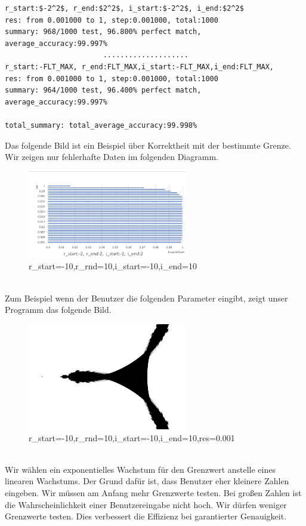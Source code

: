 \documentclass[course=erap]{aspdoc}
\begin{document}
 \begin{lstlisting}[mathescape=true]
r_start:$-2^2$, r_end:$2^2$, i_start:$-2^2$, i_end:$2^2$
res: from 0.001000 to 1, step:0.001000, total:1000
summary: 968/1000 test, 96.800% perfect match, average_accuracy:99.997%
                       ....................
r_start:-FLT_MAX, r_end:FLT_MAX,i_start:-FLT_MAX,i_end:FLT_MAX,
res: from 0.001000 to 1, step:0.001000, total:1000
summary: 964/1000 test, 96.400% perfect match, average_accuracy:99.997%

total_summary: total_average_accuracy:99.998%
\end{lstlisting}
Das folgende Bild ist ein Beispiel über Korrektheit mit der bestimmte Grenze. Wir zeigen nur fehlerhafte Daten im folgenden Diagramm.
\begin{figure}[htb]
\centering
\includegraphics [width=7cm] {pic/Korrektheit.jpg}
\caption{r\_start=-10,r\_rnd=10,i\_start=-10,i\_end=10}
\label{fig:label}
\end{figure}
\\Zum Beispiel wenn der Benutzer die folgenden Parameter eingibt, zeigt unser Programm das folgende Bild.
\begin{figure}[htb]
\centering
\includegraphics [width=7cm] {pic/ddd.png}
\caption{r\_start=-10,r\_rnd=10,i\_start=-10,i\_end=10,res=0.001}
\label{fig:label}
\end{figure}
\\Wir wählen ein exponentielles Wachstum für den Grenzwert anstelle eines linearen Wachstums. Der Grund dafür ist, dass Benutzer eher kleinere Zahlen eingeben. Wir müssen am Anfang mehr Grenzwerte testen. Bei großen Zahlen ist die Wahrscheinlichkeit einer Benutzereingabe nicht hoch. Wir dürfen weniger Grenzwerte testen. Dies verbessert die Effizienz bei garantierter Genauigkeit.
\end{document}
